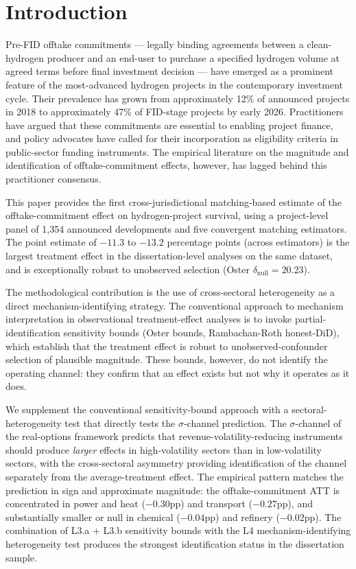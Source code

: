 \documentclass[12pt,a4paper]{article}
\theoremstyle{plain}
\theoremstyle{definition}
\begin{document}
\section{Introduction}
\label{sec:intro}

Pre-FID offtake commitments --- legally binding agreements between a clean-hydrogen producer and an end-user to purchase a specified hydrogen volume at agreed terms before final investment decision --- have emerged as a prominent feature of the most-advanced hydrogen projects in the contemporary investment cycle. Their prevalence has grown from approximately 12\% of announced projects in 2018 to approximately 47\% of FID-stage projects by early 2026. Practitioners have argued that these commitments are essential to enabling project finance, and policy advocates have called for their incorporation as eligibility criteria in public-sector funding instruments. The empirical literature on the magnitude and identification of offtake-commitment effects, however, has lagged behind this practitioner consensus.

This paper provides the first cross-jurisdictional matching-based estimate of the offtake-commitment effect on hydrogen-project survival, using a project-level panel of 1{,}354 announced developments and five convergent matching estimators. The point estimate of $-11.3$ to $-13.2$ percentage points (across estimators) is the largest treatment effect in the dissertation-level analyses on the same dataset, and is exceptionally robust to unobserved selection (Oster $\delta_{\text{null}} = 20.23$).

The methodological contribution is the use of cross-sectoral heterogeneity as a direct mechanism-identifying strategy. The conventional approach to mechanism interpretation in observational treatment-effect analyses is to invoke partial-identification sensitivity bounds (Oster bounds, Rambachan-Roth honest-DiD), which establish that the treatment effect is robust to unobserved-confounder selection of plausible magnitude. These bounds, however, do not identify the operating channel: they confirm that an effect exists but not why it operates as it does.

We supplement the conventional sensitivity-bound approach with a sectoral-heterogeneity test that directly tests the $\sigma$-channel prediction. The $\sigma$-channel of the real-options framework \cite{dixit1994investment} predicts that revenue-volatility-reducing instruments should produce \emph{larger} effects in high-volatility sectors than in low-volatility sectors, with the cross-sectoral asymmetry providing identification of the channel separately from the average-treatment effect. The empirical pattern matches the prediction in sign and approximate magnitude: the offtake-commitment ATT is concentrated in power and heat ($-0.30$pp) and transport ($-0.27$pp), and substantially smaller or null in chemical ($-0.04$pp) and refinery ($-0.02$pp). The combination of L3.a + L3.b sensitivity bounds with the L4 mechanism-identifying heterogeneity test produces the strongest identification status in the dissertation sample.
\end{document}
